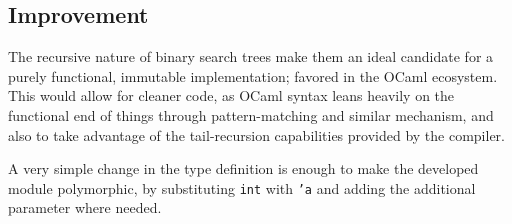 \documentclass[11pt]{scrartcl} %
\begin{document}
\subsection*{Improvement}
The recursive nature of binary search trees make them an ideal candidate for a purely functional, immutable implementation; favored in the OCaml ecosystem. This would allow for cleaner code, as OCaml syntax leans heavily on the functional end of things through pattern-matching and similar mechanism, and also to take advantage of the tail-recursion capabilities provided by the compiler.

A very simple change in the type definition is enough to make the developed module polymorphic, by substituting \texttt{int} with \texttt{'a} and adding the additional parameter where needed.
\end{document}
